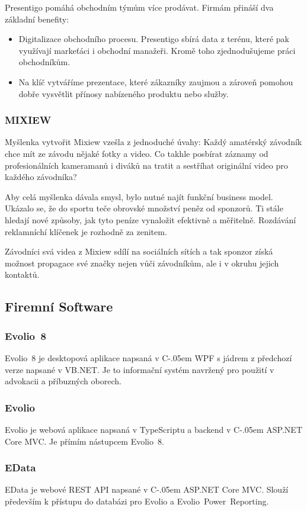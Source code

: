 \documentclass[czech,bachelor,dept460,male,csharp]{diploma}
\newcommand{\EvolioEight}{Evolio~8}
\newcommand{\EFilters}{Evolio~Power~Reporting}
\newcommand{\EvolioX}{Evolio}
\newcommand{\EData}{EData}
\newcommand{\Csharp}{%
  {\settoheight{\dimen0}{C}C\kern-.05em \resizebox{!}{\dimen0}{\raisebox{\depth}{\#}}}}
\begin{document}
		Presentigo pomáhá obchodním týmům více prodávat. Firmám přináší dva základní benefity:
		\begin{itemize}
			\item
			Digitalizace obchodního procesu. Presentigo sbírá data z terénu, které pak využívají markeťáci i obchodní manažeři. Kromě toho zjednodušujeme práci obchodníkům.
			\item
			Na klíč vytváříme prezentace, které zákazníky zaujmou a zároveň pomohou dobře vysvětlit přínosy nabízeného produktu nebo služby.
		\end{itemize}

 		\subsubsection{MIXIEW}
 		Myšlenka vytvořit Mixiew vzešla z jednoduché úvahy: Každý amatérský závodník chce mít ze závodu nějaké fotky a video. Co takhle posbírat záznamy od profesionálních kameramanů i diváků na tratit a sestříhat originální video pro každého závodníka?

		Aby celá myšlenka dávala smysl, bylo nutné najít funkční business model. Ukázalo se, že do sportu teče obrovské množství peněz od sponzorů. Ti stále hledají nové způsoby, jak tyto peníze vynaložit efektivně a měřitelně. Rozdávání reklamníchí klíčenek je rozhodně za zenitem.

		Závodníci svá videa z Mixiew sdílí na sociálních sítích a tak sponzor získá možnost propagace své značky nejen vůči závodníkům, ale i v okruhu jejich kontaktů.
	\subsection{Firemní Software}
		\subsubsection{\EvolioEight}
		{\EvolioEight} je desktopová aplikace napsaná v {\Csharp} WPF s jádrem z předchozí verze napsané v VB.NET. Je to informační systém navržený pro použití v advokacii a příbuzných oborech. 
		\subsubsection{\EvolioX}
		{\EvolioX} je webová aplikace napsaná v TypeScriptu a backend v {\Csharp} ASP.NET Core MVC. Je přímím nástupcem {\EvolioEight}.
		\subsubsection{\EData}
		{\EData} je webové REST API napsané v {\Csharp} ASP.NET Core MVC.
		Slouží především k přístupu do databázi pro {\EvolioX} a {\EFilters}.
\end{document}
